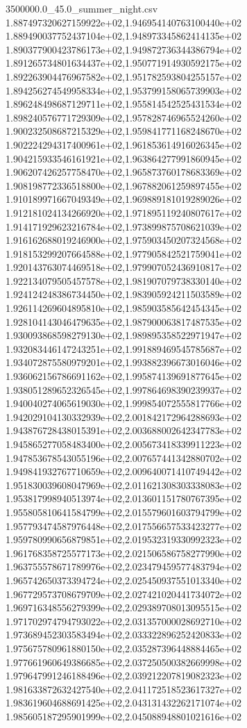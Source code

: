 \begin{filecontents*}{3500000.0_45.0_summer_night.csv}
1.887497320627159922e+02,1.946954140763100440e+02
1.889490037752437104e+02,1.948973345862414135e+02
1.890377900423786173e+02,1.949872736344386794e+02
1.891265734801634437e+02,1.950771914930592175e+02
1.892263904476967582e+02,1.951782593804255157e+02
1.894256274549958334e+02,1.953799158065739903e+02
1.896248498687129711e+02,1.955814542525431534e+02
1.898240576771729309e+02,1.957828746965524260e+02
1.900232508687215329e+02,1.959841771168248670e+02
1.902224294317400961e+02,1.961853614916026345e+02
1.904215933546161921e+02,1.963864277991860945e+02
1.906207426257758470e+02,1.965873760178683369e+02
1.908198772336518800e+02,1.967882061259897455e+02
1.910189971667049349e+02,1.969889181019289026e+02
1.912181024134266920e+02,1.971895119240807617e+02
1.914171929623216784e+02,1.973899875708621039e+02
1.916162688019246900e+02,1.975903450207324568e+02
1.918153299207664588e+02,1.977905842521759041e+02
1.920143763074469518e+02,1.979907052436910817e+02
1.922134079505457578e+02,1.981907079738330140e+02
1.924124248386734450e+02,1.983905924211503589e+02
1.926114269604895810e+02,1.985903585642454345e+02
1.928104143046479635e+02,1.987900063817487535e+02
1.930093868598279130e+02,1.989895358522971947e+02
1.932083446147243251e+02,1.991889469545785687e+02
1.934072875580979201e+02,1.993882396673016046e+02
1.936062156786691162e+02,1.995874139691877645e+02
1.938051289652326545e+02,1.997864698390239937e+02
1.940040274065619030e+02,1.999854072555817766e+02
1.942029104130332939e+02,2.001842172964288693e+02
1.943876728438015391e+02,2.003688002642347783e+02
1.945865277058483400e+02,2.005673418339911223e+02
1.947853678543055196e+02,2.007657441342880702e+02
1.949841932767710659e+02,2.009640071410749442e+02
1.951830039608047969e+02,2.011621308303338083e+02
1.953817998940513974e+02,2.013601151780767395e+02
1.955805810641584799e+02,2.015579601603794799e+02
1.957793474587976448e+02,2.017556657533423277e+02
1.959780990656879851e+02,2.019532319330992323e+02
1.961768358725577173e+02,2.021506586758277990e+02
1.963755578671789976e+02,2.023479459577483794e+02
1.965742650373394724e+02,2.025450937551013340e+02
1.967729573708679709e+02,2.027421020441734072e+02
1.969716348556279399e+02,2.029389708013095515e+02
1.971702974794793022e+02,2.031357000028692710e+02
1.973689452303583494e+02,2.033322896252420833e+02
1.975675780961880150e+02,2.035287396448884465e+02
1.977661960649386685e+02,2.037250500382669998e+02
1.979647991246188496e+02,2.039212207819082323e+02
1.981633872632427540e+02,2.041172518523617327e+02
1.983619604688691425e+02,2.043131432262171074e+02
1.985605187295901999e+02,2.045088948801021616e+02

\end{filecontents*}
